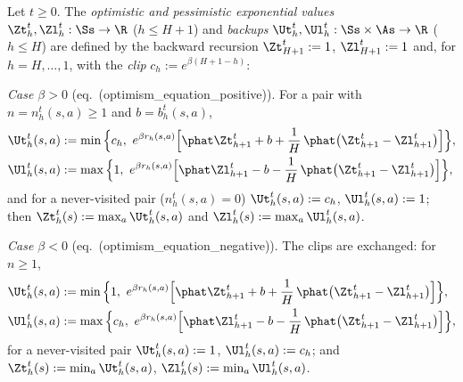 \begin{definition}\label{def:backups}
\leanok
{}
Let $t \ge 0$. The \emph{optimistic and pessimistic exponential values} $\Zt^t_h, \Zl^t_h : \Ss \to \R$
($h \le H + 1$) and \emph{backups} $\Ut^t_h, \Ul^t_h : \Ss \times \As \to \R$ ($h \le H$) are defined by the
backward recursion $\Zt^t_{H+1} := 1$, $\Zl^t_{H+1} := 1$ and, for $h = H, \dots, 1$, with the
\emph{clip} $c_h := e^{\beta(H + 1 - h)}$:

\emph{Case $\beta > 0$} (eq.~(optimism\_equation\_positive)). For a pair with $n = n_h^t(s, a) \ge 1$
and $b = b_h^t(s, a)$,
\begin{align*}
  \Ut^t_h(s, a) &:= \min\Big\{ c_h,\ e^{\beta r_h(s, a)} \Big[ \phat \Zt^t_{h+1} + b + \frac1H\, \phat\big(\Zt^t_{h+1} - \Zl^t_{h+1}\big) \Big] \Big\}, \\
  \Ul^t_h(s, a) &:= \max\Big\{ 1,\ e^{\beta r_h(s, a)} \Big[ \phat \Zl^t_{h+1} - b - \frac1H\, \phat\big(\Zt^t_{h+1} - \Zl^t_{h+1}\big) \Big] \Big\},
\end{align*}
and for a never-visited pair ($n_h^t(s, a) = 0$) $\Ut^t_h(s, a) := c_h$, $\Ul^t_h(s, a) := 1$; then
$\Zt^t_h(s) := \max_{a} \Ut^t_h(s, a)$ and $\Zl^t_h(s) := \max_a \Ul^t_h(s, a)$.

\emph{Case $\beta < 0$} (eq.~(optimism\_equation\_negative)). The clips are exchanged: for $n \ge 1$,
\begin{align*}
  \Ut^t_h(s, a) &:= \min\Big\{ 1,\ e^{\beta r_h(s, a)} \Big[ \phat \Zt^t_{h+1} + b + \frac1H\, \phat\big(\Zt^t_{h+1} - \Zl^t_{h+1}\big) \Big] \Big\}, \\
  \Ul^t_h(s, a) &:= \max\Big\{ c_h,\ e^{\beta r_h(s, a)} \Big[ \phat \Zl^t_{h+1} - b - \frac1H\, \phat\big(\Zt^t_{h+1} - \Zl^t_{h+1}\big) \Big] \Big\},
\end{align*}
for a never-visited pair $\Ut^t_h(s, a) := 1$, $\Ul^t_h(s, a) := c_h$; and
$\Zt^t_h(s) := \min_a \Ut^t_h(s, a)$, $\Zl^t_h(s) := \min_a \Ul^t_h(s, a)$.
\end{definition}

